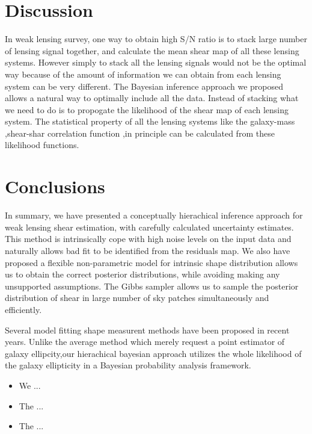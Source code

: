 \documentclass[useAMS,usenatbib]{mn2e}
\begin{document}



\section{Discussion}

\label{sec:XXX} In weak lensing survey, one way to obtain high S/N
ratio is to stack large number of lensing signal together, and calculate
the mean shear map of all these lensing systems. However simply to
stack all the lensing signals would not be the optimal way because
of the amount of information we can obtain from each lensing system
can be very different. The Bayesian inference approach we proposed
allows a natural way to optimally include all the data. Instead of
stacking what we need to do is to propogate the likelihood of the
shear map of each lensing system. The statistical property of all
the lensing systems like the galaxy-mass ,shear-shar correlation function
,in principle can be calculated from these likelihood functions.






\section{Conclusions}

\label{sec:conclusions}

In summary, we have presented a conceptually hierachical inference
approach for weak lensing shear estimation, with carefully calculated 
uncertainty estimates. This method is intrinsically cope with high noise
levels on the input data and naturally allows bad fit to be identified 
from the residuals map. We also have proposed a flexible non-parametric model 
for intrinsic shape distribution allows us to obtain the correct posterior 
distributions, while avoiding making any unsupported assumptions. The Gibbs
sampler allows us to sample the posterior distribution of shear in large number of
sky patches simultaneously and efficiently.

Several  model fitting  shape measurent methods have been proposed in recent years.
Unlike the average method which merely request a point estimator of galaxy ellipcity,our 
hierachical bayesian approach utilizes the whole likelihood of the galaxy ellipticity in a Bayesian probability analysis framework.
\begin{itemize}
\item We ...
\item The ...
\item The ...
\end{itemize}
\end{document}
